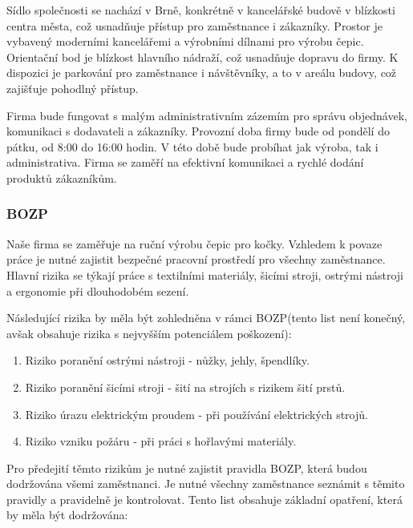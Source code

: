 \documentclass[12pt, a4paper]{article}
\begin{document}
Sídlo společnosti se nachází v Brně, konkrétně v kancelářské budově v blízkosti centra města, což usnadňuje přístup pro zaměstnance i zákazníky.
Prostor je vybavený moderními kancelářemi a výrobními dílnami pro výrobu čepic.
Orientační bod je blízkost hlavního nádraží, což usnadňuje dopravu do firmy.
K dispozici je parkování pro zaměstnance i návštěvníky, a to v areálu budovy, což zajišťuje pohodlný přístup.
\vspace{10pt}

Firma bude fungovat s malým administrativním zázemím pro správu objednávek, komunikaci s dodavateli a zákazníky.
Provozní doba firmy bude od pondělí do pátku, od 8:00 do 16:00 hodin.
V této době bude probíhat jak výroba, tak i administrativa.
Firma se zaměří na efektivní komunikaci a rychlé dodání produktů zákazníkům.

\pagebreak

\subsubsection{BOZP}

Naše firma se zaměřuje na ruční výrobu čepic pro kočky. 
Vzhledem k povaze práce je nutné zajistit bezpečné pracovní prostředí pro všechny zaměstnance. 
Hlavní rizika se týkají práce s textilními materiály, šicími stroji, ostrými nástroji a ergonomie při dlouhodobém sezení.
\vspace{10pt}

Následující rizika by měla být zohledněna v rámci BOZP(tento list není konečný, avšak obsahuje rizika s nejvyšším potenciálem poškození):

\begin{enumerate}
  \item Riziko poranění ostrými nástroji - nůžky, jehly, špendlíky.
  \item Riziko poranění šicími stroji - šití na strojích s rizikem šití prstů.
  \item Riziko úrazu elektrickým proudem - při používání elektrických strojů.
  \item Riziko vzniku požáru - při práci s hořlavými materiály.
\end{enumerate}

\vspace{10pt}

Pro předejití těmto rizikům je nutné zajistit pravidla BOZP, která budou dodržována všemi zaměstnanci.
Je nutné všechny zaměstnance seznámit s těmito pravidly a pravidelně je kontrolovat. Tento list
obsahuje základní opatření, která by měla být dodržována:
\end{document}
